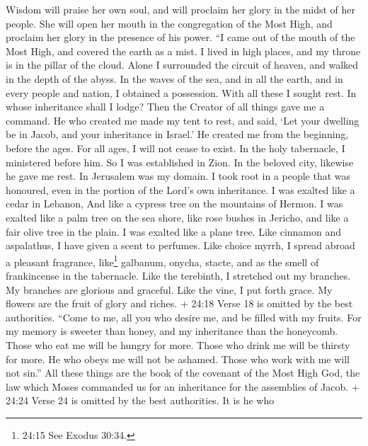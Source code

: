  Wisdom will praise her own soul, and will proclaim her
glory in the midst of her people.  She will open her mouth
in the congregation of the Most High, and proclaim her glory in the
presence of his power.  ``I came out of the mouth of the
Most High, and covered the earth as a mist.  I lived in high
places, and my throne is in the pillar of the cloud.  Alone
I surrounded the circuit of heaven, and walked in the depth of the
abyss.  In the waves of the sea, and in all the earth, and
in every people and nation, I obtained a possession.  With
all these I sought rest. In whose inheritance shall I lodge?
 Then the Creator of all things gave me a command. He who
created me made my tent to rest, and said, `Let your dwelling be in
Jacob, and your inheritance in Israel.'  He created me from
the beginning, before the ages. For all ages, I will not cease to exist.
 In the holy tabernacle, I ministered before him. So I was
established in Zion.  In the beloved city, likewise he gave
me rest. In Jerusalem was my domain.  I took root in a
people that was honoured, even in the portion of the Lord's own
inheritance.  I was exalted like a cedar in Lebanon, And
like a cypress tree on the mountains of Hermon.  I was
exalted like a palm tree on the sea shore, like rose bushes in Jericho,
and like a fair olive tree in the plain. I was exalted like a plane
tree.  Like cinnamon and aspalathus, I have given a scent
to perfumes. Like choice myrrh, I spread abroad a pleasant fragrance,
like\footnote{24:15 See Exodus 30:34.} galbanum, onycha, stacte, and as
the smell of frankincense in the tabernacle.  Like the
terebinth, I stretched out my branches. My branches are glorious and
graceful.  Like the vine, I put forth grace. My flowers are
the fruit of glory and riches.  + 24:18 Verse 18 is omitted
by the best authorities.  ``Come to me, all you who desire
me, and be filled with my fruits.  For my memory is sweeter
than honey, and my inheritance than the honeycomb.  Those
who eat me will be hungry for more. Those who drink me will be thirsty
for more.  He who obeys me will not be ashamed. Those who
work with me will not sin.''  All these things are the book
of the covenant of the Most High God, the law which Moses commanded us
for an inheritance for the assemblies of Jacob.  + 24:24
Verse 24 is omitted by the best authorities.  It is he who
